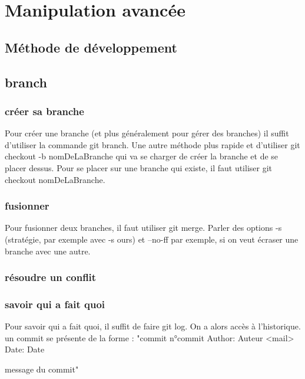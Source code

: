 \documentclass[a4paper,10pt]{report}
\begin{document}
\chapter{Manipulation avancée}
  \section{Méthode de développement}
  \section{branch}
     \subsection{créer sa branche}
     Pour créer une branche (et plus généralement pour gérer des branches) il suffit d'utiliser la commande git branch. Une autre méthode plus rapide et d'utiliser git checkout -b nomDeLaBranche qui va se charger de créer la branche et de se placer dessus. Pour se placer sur une branche qui existe, il faut utiliser git checkout nomDeLaBranche.
     \subsection{fusionner}
     Pour fusionner deux branches, il faut utiliser git merge.
     Parler des options -s (stratégie, par exemple avec -s ours) et --no-ff par exemple, si on veut écraser une branche avec une autre.
     \subsection{résoudre un conflit}
     \subsection{savoir qui a fait quoi}
     Pour savoir qui a fait quoi, il suffit de faire git log. On a alors accès à l'historique. un commit se présente de la forme : 
     "commit n°commit
Author: Auteur <mail>
Date:   Date

    message du commit"
\end{document}
